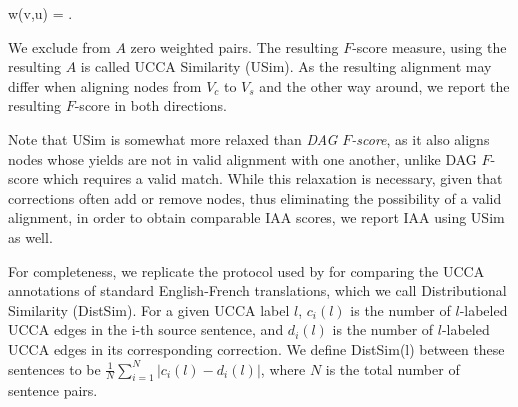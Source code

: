 \documentclass[a4paper, 11pt]{article}
\newenvironment{myequation*}{
	\vspace{-1em}
	\begin{equation*}
}{
\end{equation*}
\vspace{-1.2em}
}
\begin{document}
\begin{small}
	\vspace{0.15cm}
 \begin{myequation*}
  w\left(v,u\right) = .
 \end{myequation*}
\end{small}

We exclude from $A$ zero weighted pairs.
The resulting $F$-score measure, using the resulting $A$ is called UCCA Similarity ({\sc USim}).
As the resulting alignment may differ when aligning nodes from $V_c$ to $V_s$
and the other way around, we report the resulting $F$-score in both directions.

Note that {\sc USim} is somewhat more relaxed than {\it DAG $F$-score},
as it also aligns nodes whose yields are not in valid alignment with one another,
unlike DAG $F$-score which requires a valid match.
While this relaxation is necessary, given that corrections often add
or remove nodes, thus eliminating the possibility of a valid alignment,
in order to obtain comparable IAA scores, we report IAA using {\sc USim} as well.
%

For completeness, we replicate the protocol used by 
for comparing the UCCA annotations of standard English-French translations, which we call
Distributional Similarity ({\sc DistSim}).
For a given UCCA label $l$, $c_i(l)$ is the number of $l$-labeled UCCA edges
in the i-th source sentence, and $d_i(l)$ is the number of $l$-labeled UCCA edges
in its corresponding correction. We define {\sc DistSim}(l) between these
sentences to be $\frac{1}{N}\sum_{i=1}^N \vert c_i(l) - d_i(l) \vert$, where
$N$ is the total number of sentence pairs.
\end{document}
